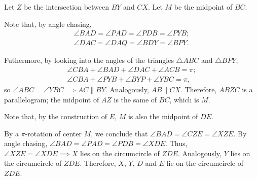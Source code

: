 Let $Z$ be the intersection between $BY$ and $CX$.
Let $M$ be the midpoint of $BC$.

Note that, by angle chasing,
\begin{gather*}
	\angle BAD = \angle PAD = \angle PDB = \angle PYB;\\
	\angle DAC = \angle DAQ = \angle BDY = \angle BPY.
\end{gather*}

Futhermore, by looking into the angles of the triangles $\triangle ABC$ and $\triangle BPY$, 
\begin{gather*}
	\angle CBA + \angle BAD + \angle DAC + \angle ACB = \pi; \\ 
	\angle CBA + \angle PYB + \angle BYP + \angle YBC = \pi,
\end{gather*}
so $\angle ABC = \angle YBC \implies AC \parallel BY$.
Analogously, $AB \parallel CX$.
Therefore, $ABZC$ is a parallelogram; the midpoint of $AZ$ is the same of $BC$, which is $M$.

Note that, by the construction of $E$, $M$ is also the midpoint of $DE$.

By a $\pi$-rotation of center $M$, we conclude that $\angle BAD = \angle CZE = \angle XZE$.
By angle chasing, $\angle BAD = \angle PAD = \angle PDB = \angle XDE$. Thus, $\angle XZE = \angle XDE \implies X$ lies on the circumcircle of $ZDE$. Analogously, $Y$ lies on the circumcircle of $ZDE$. Therefore, $X$, $Y$, $D$ and $E$ lie on the circumcircle of $ZDE$. 
